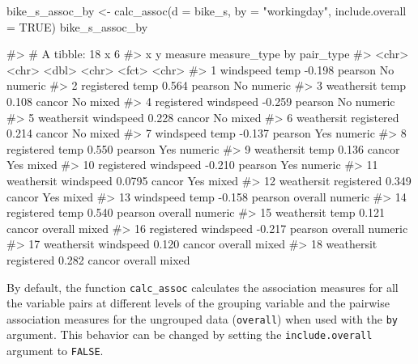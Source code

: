 \begin{Schunk}
\begin{Sinput}
bike_s_assoc_by <- calc_assoc(d = bike_s,
                            by = "workingday",
                            include.overall = TRUE)
bike_s_assoc_by
\end{Sinput}
\begin{Soutput}
#> # A tibble: 18 x 6
#>    x          y          measure measure_type by      pair_type
#>    <chr>      <chr>        <dbl> <chr>        <fct>   <chr>    
#>  1 windspeed  temp       -0.198  pearson      No      numeric  
#>  2 registered temp        0.564  pearson      No      numeric  
#>  3 weathersit temp        0.108  cancor       No      mixed    
#>  4 registered windspeed  -0.259  pearson      No      numeric  
#>  5 weathersit windspeed   0.228  cancor       No      mixed    
#>  6 weathersit registered  0.214  cancor       No      mixed    
#>  7 windspeed  temp       -0.137  pearson      Yes     numeric  
#>  8 registered temp        0.550  pearson      Yes     numeric  
#>  9 weathersit temp        0.136  cancor       Yes     mixed    
#> 10 registered windspeed  -0.210  pearson      Yes     numeric  
#> 11 weathersit windspeed   0.0795 cancor       Yes     mixed    
#> 12 weathersit registered  0.349  cancor       Yes     mixed    
#> 13 windspeed  temp       -0.158  pearson      overall numeric  
#> 14 registered temp        0.540  pearson      overall numeric  
#> 15 weathersit temp        0.121  cancor       overall mixed    
#> 16 registered windspeed  -0.217  pearson      overall numeric  
#> 17 weathersit windspeed   0.120  cancor       overall mixed    
#> 18 weathersit registered  0.282  cancor       overall mixed
\end{Soutput}
\end{Schunk}

By default, the function \texttt{calc\_assoc} calculates the association
measures for all the variable pairs at different levels of the grouping
variable and the pairwise association measures for the ungrouped data
(\texttt{overall}) when used with the \texttt{by} argument. This
behavior can be changed by setting the \texttt{include.overall} argument
to \texttt{FALSE}.


